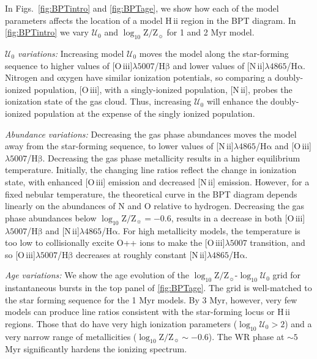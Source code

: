 \documentclass[twocolumn, tighten]{aastex61}
\newcommand{\Fig}[1]{\autoref{fig:#1}}
\newcommand{\logten}{\ensuremath{\log_{10}}}
\newcommand{\nii}{[N\,{\sc ii}]\xspace}
\newcommand{\oiii}{[O\,{\sc iii}]\xspace}
\newcommand{\ha}{\ensuremath{\mathrm{H\alpha}}}
\newcommand{\hb}{\ensuremath{\mathrm{H\beta}}}
\newcommand{\hii}{H\,{\sc ii}\xspace}
\newcommand\lam[1]{\ensuremath{\lambda #1}}
\newcommand{\logz}{\ensuremath{\logten \mathrm{Z}/\mathrm{Z}_{\sun}}}
\newcommand{\logZeq}[1]{\ensuremath{\logten \mathrm{Z}/\mathrm{Z}_{\sun} = #1}}
\newcommand{\U}{\ensuremath{\mathcal{U}_{0}}}
\newcommand{\logU}{\ensuremath{\logten \mathcal{U}_0}}
\newcommand\niiha{\nii{}\lam{4865}/\ha{}}
\newcommand\oiiihb{\oiii{}\lam{5007}/\hb{}}
\begin{document}
In Figs.~\ref{fig:BPTintro} and \ref{fig:BPTage}, we show how each of the model parameters affects the location of a model \hii region in the BPT diagram. In \Fig{BPTintro} we vary \U{} and \logz{} for 1 and 2 Myr model.

{\it \U{} variations:} Increasing model \U{} moves the model along the star-forming sequence to higher values of \oiiihb{} and lower values of \niiha{}. Nitrogen and oxygen have similar ionization potentials, so comparing a doubly-ionized population, \oiii{}, with a singly-ionized population, \nii{}, probes the ionization state of the gas cloud. Thus, increasing \U{} will enhance the doubly-ionized population at the expense of the singly ionized population.

{\it Abundance variations:} Decreasing the gas phase abundances moves the model away from the star-forming sequence, to lower values of \niiha{} and \oiiihb{}. Decreasing the gas phase metallicity results in a higher equilibrium temperature. Initially, the changing line ratios reflect the change in ionization state, with enhanced \oiii{} emission and decreased \nii{} emission. However, for a fixed nebular temperature, the theoretical curve in the BPT diagram depends linearly on the abundances of N and O relative to hydrogen. Decreasing the gas phase abundances below \logZeq{-0.6},  results in a decrease in both \oiiihb{} and \niiha{}. For high metallicity models, the temperature is too low to collisionally excite O++ ions to make the \oiii{}\lam{5007} transition, and so \oiiihb{} decreases at roughly constant \niiha{}.

{\it Age variations:} We show the age evolution of the \logz{}-\logU{} grid for instantaneous bursts in the top panel of \Fig{BPTage}. The grid is well-matched to the star forming sequence for the 1 Myr models. By 3 Myr, however, very few models can produce line ratios consistent with the star-forming locus or \hii regions. Those that do have very high ionization parameters ($\logU > 2$) and a very narrow range of metallicities ($\logz \sim -0.6$). The WR phase at $\sim5$ Myr significantly hardens the ionizing spectrum.
\end{document}
